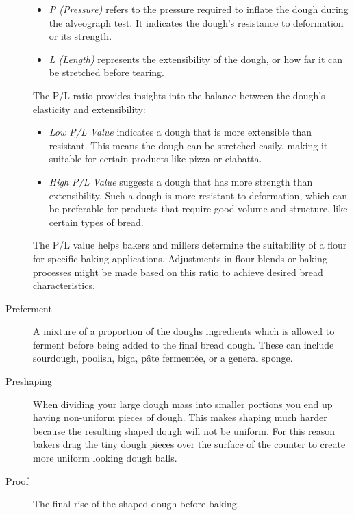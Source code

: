 \begin{description}
\begin{itemize}
    \item[] \emph{P (Pressure)} refers to the pressure required to inflate the
        dough during the alveograph test. It indicates the dough's resistance
        to deformation or its strength.
    \item[] \emph{L (Length)} represents the extensibility of the dough, or
        how far it can be stretched before tearing.
\end{itemize}
The P/L ratio provides insights into the balance between the dough's elasticity and
extensibility:
%
\begin{itemize}
    \item[] \emph{Low P/L Value} indicates a dough that is more extensible
        than resistant. This means the dough can be stretched easily, making
        it suitable for certain products like pizza or ciabatta.
    \item[] \emph{High P/L Value} suggests a dough that has more strength than
        extensibility. Such a dough is more resistant to deformation, which
        can be preferable for products that require good volume and structure,
        like certain types of bread.
\end{itemize}
The P/L value helps bakers and millers determine the suitability of a flour for
specific baking applications. Adjustments in flour blends or baking processes might
be made based on this ratio to achieve desired bread characteristics.

\item[Preferment] A mixture of a proportion of the doughs ingredients which is
allowed to ferment before being added to the final bread dough. These can include
sourdough, poolish, biga, pâte fermentée, or a general sponge.

\item[Preshaping] When dividing your large dough mass into smaller portions you end
up having non-uniform pieces of dough. This makes shaping much harder because the
resulting shaped dough will not be uniform. For this reason bakers drag the tiny dough
pieces over the surface of the counter to create more uniform looking dough balls.

\item[Proof] The final rise of the shaped dough before baking.


\end{description}
